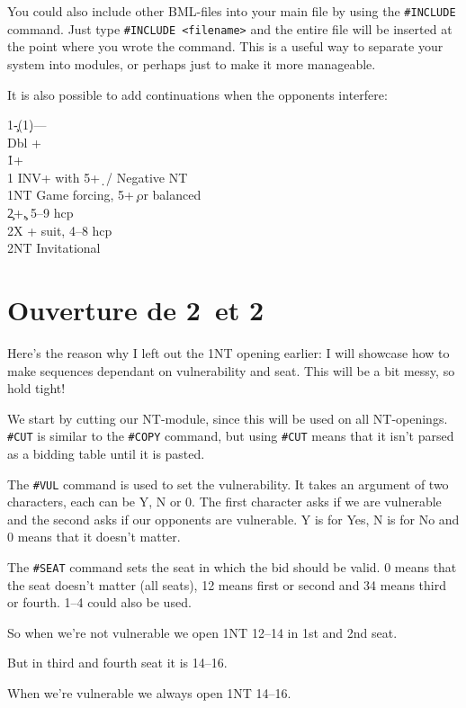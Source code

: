 \documentclass[a4paper]{article}
\begin{document}
You could also include other BML-files into your main file by using
the \texttt{\#INCLUDE} command. Just type \texttt{\#INCLUDE <filename>} and the entire
file will be inserted at the point where you wrote the command. This
is a useful way to separate your system into modules, or perhaps
just to make it more manageable.

It is also possible to add continuations when the opponents
interfere:

\begin{bidtable}
1\c-(1\d)---\\
Dbl +\h \\
1\h {}+\s \\
1\s \> INV+ with 5+\d\ / Negative NT\\
1NT \> Game forcing, 5+\c\ or balanced\\
2\c {}+\c , 5--9 hcp\\
2X + suit, 4--8 hcp\\
2NT \> Invitational
\end{bidtable}

\section{Ouverture de 2\pdfh\ et 2\pdfs}

Here's the reason why I left out the 1NT opening earlier: I will
showcase how to make sequences dependant on vulnerability and
seat. This will be a bit messy, so hold tight!

We start by cutting our NT-module, since this will be used on all
NT-openings. \texttt{\#CUT} is similar to the \texttt{\#COPY} command, but using \texttt{\#CUT}
means that it isn't parsed as a bidding table until it is pasted.

The \texttt{\#VUL} command is used to set the vulnerability. It takes an
argument of two characters, each can be Y, N or 0. The first
character asks if we are vulnerable and the second asks if our
opponents are vulnerable. Y is for Yes, N is for No and 0 means that
it doesn't matter.

The \texttt{\#SEAT} command sets the seat in which the bid should be valid. 0
means that the seat doesn't matter (all seats), 12 means first or
second and 34 means third or fourth. 1--4 could also be used.

So when we're not vulnerable we open 1NT 12--14 in 1st and 2nd seat.

But in third and fourth seat it is 14--16.

When we're vulnerable we always open 1NT 14--16.
\end{document}
